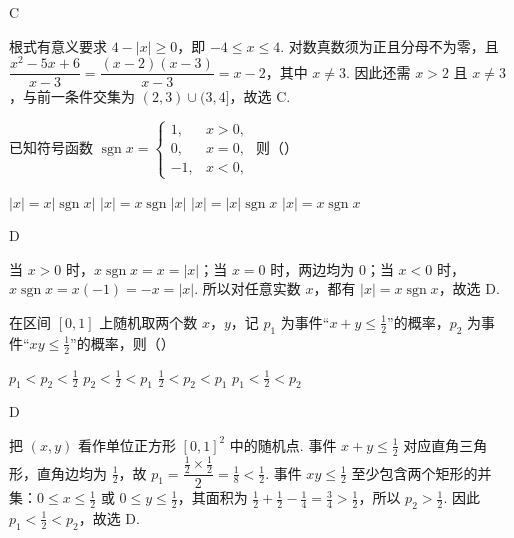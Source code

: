 \begin{answer}
C
\end{answer}

\begin{solution}
根式有意义要求 \(4-|x|\geqslant0\)，即 \(-4\leqslant x\leqslant4\). 对数真数须为正且分母不为零，且
\(\dfrac{x^2-5x+6}{x-3}=\dfrac{(x-2)(x-3)}{x-3}=x-2\)，其中 \(x\neq3\). 因此还需 \(x>2\) 且 \(x\neq3\)，与前一条件交集为 \((2,3)\cup(3,4]\)，故选 C.
\end{solution}

\begin{problem}
已知符号函数 \(\operatorname{sgn}x=\begin{cases}
1, & x>0,\\
0, & x=0,\\
-1, & x<0,
\end{cases}\) 则（\quad）

\choices
    {\(|x|=x|\operatorname{sgn}x|\)}
    {\(|x|=x\operatorname{sgn}|x|\)}
    {\(|x|=|x|\operatorname{sgn}x\)}
    {\(|x|=x\operatorname{sgn}x\)}
\end{problem}

\begin{answer}
D
\end{answer}

\begin{solution}
当 \(x>0\) 时，\(x\operatorname{sgn}x=x=|x|\)；当 \(x=0\) 时，两边均为 \(0\)；当 \(x<0\) 时，\(x\operatorname{sgn}x=x(-1)=-x=|x|\). 所以对任意实数 \(x\)，都有 \(|x|=x\operatorname{sgn}x\)，故选 D.
\end{solution}

\begin{problem}
在区间 \([0,1]\) 上随机取两个数 \(x\)，\(y\)，记 \(p_1\) 为事件“\(x+y\leqslant \frac{1}{2}\)”的概率，\(p_2\) 为事件“\(xy\leqslant \frac{1}{2}\)”的概率，则（\quad）

\choices
    {\(p_1<p_2<\frac{1}{2}\)}
    {\(p_2<\frac{1}{2}<p_1\)}
    {\(\frac{1}{2}<p_2<p_1\)}
    {\(p_1<\frac{1}{2}<p_2\)}
\end{problem}

\begin{answer}
D
\end{answer}

\begin{solution}
把 \((x,y)\) 看作单位正方形 \([0,1]^2\) 中的随机点. 事件 \(x+y\leqslant\frac12\) 对应直角三角形，直角边均为 \(\frac12\)，故 \(p_1=\dfrac{\frac12\times\frac12}{2}=\frac18<\frac12\). 事件 \(xy\leqslant\frac12\) 至少包含两个矩形的并集：\(0\leqslant x\leqslant\frac12\) 或 \(0\leqslant y\leqslant\frac12\)，其面积为 \(\frac12+\frac12-\frac14=\frac34>\frac12\)，所以 \(p_2>\frac12\). 因此 \(p_1<\frac12<p_2\)，故选 D.
\end{solution}

